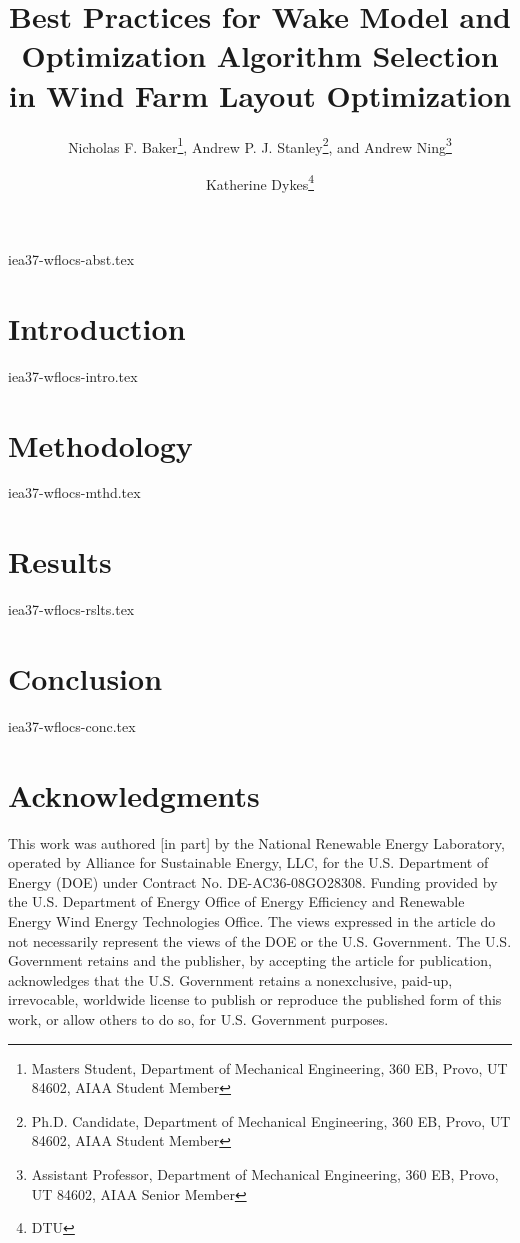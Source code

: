 \documentclass[conf,hidelinks]{new-aiaa} %
\title{Best Practices for Wake Model and Optimization Algorithm Selection in Wind Farm Layout Optimization}
\author{Nicholas F. Baker\footnote{Masters Student, Department of Mechanical Engineering, 360 EB, Provo, UT 84602, AIAA Student Member},
		 Andrew P. J. Stanley\footnote{Ph.D. Candidate, Department of Mechanical Engineering, 360 EB, Provo, UT 84602, AIAA Student Member},
		 and Andrew Ning\footnote{Assistant Professor, Department of Mechanical Engineering, 360 EB, Provo, UT 84602, AIAA Senior Member}}
\affil{Brigham Young University, Provo, Utah 84602.}
\author{Katherine Dykes\footnote{DTU}}
\affil{National Renewable Energy Laboratory, Golden, Colorado 80401}
\begin{document}
\maketitle{}

{iea37-wflocs-abst.tex}

\section{Introduction}

	{iea37-wflocs-intro.tex}

\section{Methodology} \label{sec:meth}

	{iea37-wflocs-mthd.tex}

\section{Results} \label{sec:res}

	{iea37-wflocs-rslts.tex}

\section{Conclusion} \label{sec:conc}

	{iea37-wflocs-conc.tex}

\pagebreak
\appendix

\section*{Acknowledgments}
This work was authored [in part] by the National Renewable Energy Laboratory, operated by Alliance for Sustainable Energy, LLC, for the U.S. Department of Energy (DOE) under Contract No. DE-AC36-08GO28308.
Funding provided by the U.S. Department of Energy Office of Energy Efficiency and Renewable Energy Wind Energy Technologies Office.
The views expressed in the article do not necessarily represent the views of the DOE or the U.S. Government.
The U.S. Government retains and the publisher, by accepting the article for publication, acknowledges that the U.S. Government retains a nonexclusive, paid-up, irrevocable, worldwide license to publish or reproduce the published form of this work, or allow others to do so, for U.S. Government purposes.
\end{document}
